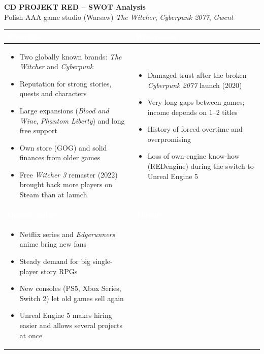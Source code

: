 \documentclass[11pt,a4paper]{article}
\newcommand{\head}[2]{\cellcolor{#1}\textcolor{white}{\textbf{\large #2}}}
\begin{document}
\begin{center}
  {\LARGE\bfseries CD PROJEKT RED -- SWOT Analysis}\\[4pt]
  {\small Polish AAA game studio (Warsaw) \textbullet{} \textit{The Witcher}, \textit{Cyberpunk 2077}, \textit{Gwent}}
\end{center}

\vspace{6pt}

\begin{tabularx}{\textwidth}{|>{\raggedright\arraybackslash}X|>{\raggedright\arraybackslash}X|}
\hline
\head{sgreen}{Strengths} & \head{wred}{Weaknesses} \\
\hline
\begin{itemize}
  \item Two globally known brands: \textit{The Witcher} and \textit{Cyberpunk}
  \item Reputation for strong stories, quests and characters
  \item Large expansions (\textit{Blood and Wine}, \textit{Phantom Liberty}) and long free support
  \item Own store (GOG) and solid finances from older games
  \item Free \textit{Witcher 3} remaster (2022) brought back more players on Steam than at launch
\end{itemize}
&
\begin{itemize}
  \item Damaged trust after the broken \textit{Cyberpunk 2077} launch (2020)
  \item Very long gaps between games; income depends on 1--2 titles
  \item History of forced overtime and overpromising
  \item Loss of own-engine know-how (REDengine) during the switch to Unreal Engine 5
\end{itemize}
\\
\hline
\head{oblue}{Opportunities} & \head{torange}{Threats} \\
\hline
\begin{itemize}
  \item Netflix series and \textit{Edgerunners} anime bring new fans
  \item Steady demand for big single-player story RPGs
  \item New consoles (PS5, Xbox Series, Switch 2) let old games sell again
  \item Unreal Engine 5 makes hiring easier and allows several projects at once

\end{itemize}
\end{tabularx}
\end{document}
